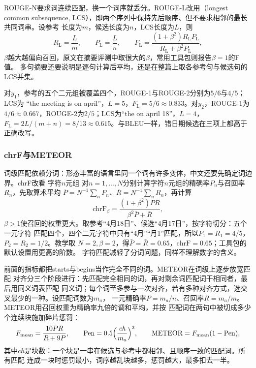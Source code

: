 ROUGE-N要求词连续匹配，换一个词序就丢分。ROUGE-L改用（longest
common subsequence, LCS），即两个序列中保持先后顺序、但不要求相邻的最长共同词串。设参考
长度为$m$，候选长度为$n$，LCS长度为$L$，则
\begin{equation}
  R_{\mathrm{L}}=\frac{L}{m},\qquad P_{\mathrm{L}}=\frac{L}{n},\qquad
  F_{\mathrm{L}}=\frac{(1+\beta^2)R_{\mathrm{L}}P_{\mathrm{L}}}{R_{\mathrm{L}}+\beta^2P_{\mathrm{L}}},
  \label{eq:nlp-generation-rouge-l}
\end{equation}
$\beta$越大越偏向召回，原文在摘要评测中取很大的$\beta$，常用工具包则报告$\beta=1$的F值。
多句摘要还要说明是逐句计算后平均，还是在整篇上取各参考句与候选句的LCS并集。

对$y_1$，参考的五个二元组被覆盖四个，ROUGE-1与ROUGE-2分别为$5/6$与$4/5$；LCS为
“the meeting is on april”，$L=5$，$F_{\mathrm L}=5/6\approx0.833$。对$y_2$，ROUGE-1为
$4/6\approx0.667$，ROUGE-2为$2/5$；LCS为“the on april 18”，$L=4$，
$F_{\mathrm L}=2L/(m+n)=8/13\approx0.615$。与BLEU一样，错日期候选在三项上都高于正确改写。

\subsubsection{chrF与METEOR}
\label{sec:nlp-generation-chrf-meteor}

词级匹配依赖分词：形态丰富的语言里同一个词有许多变体，中文还要先确定词边界。chrF改看
字符$n$元组
对$n=1,\ldots,N$分别计算字符$n$元组的精确率$P_n$与召回率$R_n$，先取算术平均
$\bar P=N^{-1}\sum_nP_n$、$\bar R=N^{-1}\sum_nR_n$，再计算
\[
  \mathrm{chrF}_\beta=\frac{(1+\beta^2)\bar P\bar R}{\beta^2\bar P+\bar R},
\]
$\beta>1$使召回的权重更大。取参考“4月18日”、候选“4月17日”，按字符切分：五个一元字符
匹配四个，四个二元字符中只有“4月”“月1”匹配，所以$P_1=R_1=4/5$，$P_2=R_2=1/2$。教学取
$N=2,\beta=2$，得$\bar P=\bar R=0.65$，$\mathrm{chrF}=0.65$；工具包的默认设置用更高的阶数。
字符匹配减轻了分词问题，同样不理解数字的含义。

前面的指标都把starts与begins当作完全不同的词。METEOR在词级上逐步放宽匹配
对齐分三个阶段进行：先匹配完全相同的词，再对剩余词匹配词干相同者，最后用同义词表匹配
同义词；每个词至多参与一次对齐，若有多种对齐方式，选交叉最少的一种。设匹配词数为$m_a$，
一元精确率$P=m_a/n$、召回率$R=m_a/m$。METEOR用召回权重为精确率九倍的调和平均，并按
匹配词在两句中被切成多少个连续块施加碎片惩罚：
\begin{equation}
  F_{\mathrm{mean}}=\frac{10PR}{R+9P},\qquad
  \mathrm{Pen}=0.5\Bigl(\frac{\mathit{ch}}{m_a}\Bigr)^3,\qquad
  \mathrm{METEOR}=F_{\mathrm{mean}}(1-\mathrm{Pen}),
  \label{eq:nlp-generation-meteor}
\end{equation}
其中$\mathit{ch}$是块数：一个块是一串在候选与参考中都相邻、且顺序一致的匹配词。所有匹配
连成一块时惩罚最小，词序越乱块越多，惩罚越大，最多扣去一半。

